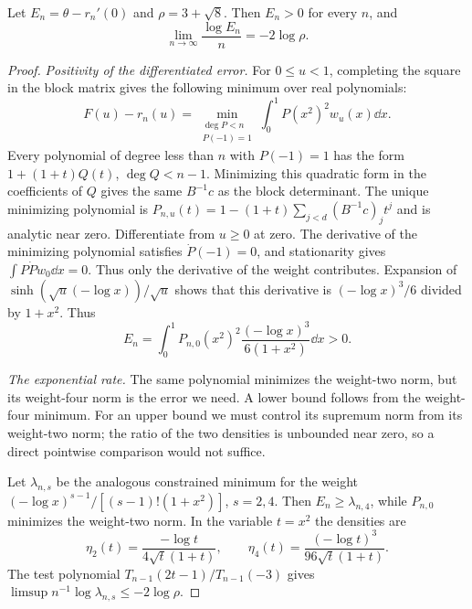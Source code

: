 \begin{proposition}\label{prop:variation}
Let $E_n=\theta-r_n'(0)$ and $\rho=3+\sqrt8$. Then $E_n>0$ for
every $n$, and
\[
 \lim_{n\to\infty}\frac{\log E_n}{n}=-2\log\rho.
\]
\end{proposition}
\begin{proof}
\emph{Positivity of the differentiated error.}
For $0\leq u<1$, completing the square in the block matrix gives
the following minimum over real polynomials:
\[
 F(u)-r_n(u)=
 \min_{\substack{\deg P<n\\P(-1)=1}}
                   \int_0^1P(x^2)^2w_u(x)\dd x.
\]
Every polynomial of degree less than $n$ with $P(-1)=1$ has the
form $1+(1+t)Q(t)$, $\deg Q<n-1$. Minimizing this quadratic form
in the coefficients of $Q$ gives the same $B^{-1}c$ as the block
determinant. The unique minimizing polynomial is
$P_{n,u}(t)=1-(1+t)\sum_{j<d}(B^{-1}c)_jt^j$ and is analytic
near zero. Differentiate from $u\geq0$ at zero. The derivative of
the minimizing polynomial satisfies $\dot P(-1)=0$, and stationarity
gives $\int P\dot P w_0\dd x=0$. Thus only the derivative of the
weight contributes. Expansion of $\sinh(\sqrt u(-\log x))/\sqrt u$
shows that this derivative is $(-\log x)^3/6$ divided by $1+x^2$.
Thus
\begin{equation}\label{eq:variation-positive}
 E_n=\int_0^1P_{n,0}(x^2)^2
                         \frac{(-\log x)^3}{6(1+x^2)}\dd x>0.
\end{equation}

\emph{The exponential rate.} The same polynomial minimizes the
weight-two norm, but its weight-four norm is the error we need.
A lower bound follows from the weight-four minimum. For an upper
bound we must control its supremum norm from its weight-two norm;
the ratio of the two densities is unbounded near zero, so a direct
pointwise comparison would not suffice.

Let $\lambda_{n,s}$ be the analogous constrained minimum for the
weight $(-\log x)^{s-1}/[(s-1)!(1+x^2)]$, $s=2,4$.
Then $E_n\geq\lambda_{n,4}$, while $P_{n,0}$ minimizes the
weight-two norm. In the variable $t=x^2$ the densities are
\[
 \eta_2(t)=\frac{-\log t}{4\sqrt t(1+t)},\qquad
 \eta_4(t)=\frac{(-\log t)^3}{96\sqrt t(1+t)}.
\]
The test polynomial $T_{n-1}(2t-1)/T_{n-1}(-3)$ gives
$\limsup n^{-1}\log\lambda_{n,s}\leq-2\log\rho$.


\end{proof}
